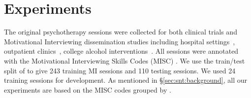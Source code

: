 \section{Experiments}
\label{sec:snt:experiments}

The original psychotherapy sessions were collected for both clinical
trials and Motivational Interviewing dissemination studies including
hospital settings~\citep{roy2014brief}, outpatient
clinics~\citep{baer2009agency}, college alcohol
interventions~\citep{tollison2008questions, neighbors2012randomized,
  lee2013indicated, lee2014randomized}.  All sessions were annotated
with the Motivational Interviewing Skills Codes (MISC)
\cite{atkins2014scaling}.  We use the train/test split of
\citet{can2015dialog, tanana2016comparison} to give 243 training MI
sessions and 110 testing sessions. We used 24 training sessions for
development.
As mentioned in \S\ref{sec:snt:background}, all our experiments are
based on the MISC codes grouped by \citet{xiao2016behavioral}.





